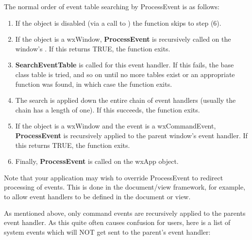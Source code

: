 The normal order of event table searching by ProcessEvent is as follows:

\begin{enumerate}\itemsep=0pt
\item If the object is disabled (via a call to )
the function skips to step (6).
\item If the object is a wxWindow, {\bf ProcessEvent} is recursively called on the window's\rtfsp
{}. If this returns TRUE, the function exits.
\item {\bf SearchEventTable} is called for this event handler. If this fails, the base
class table is tried, and so on until no more tables exist or an appropriate function was found,
in which case the function exits.
\item The search is applied down the entire chain of event handlers (usually the chain has a length
of one). If this succeeds, the function exits.
\item If the object is a wxWindow and the event is a wxCommandEvent, {\bf ProcessEvent} is
recursively applied to the parent window's event handler. If this returns TRUE, the function exits.
\item Finally, {\bf ProcessEvent} is called on the wxApp object.
\end{enumerate}

Note that your application may wish to override ProcessEvent to redirect processing of
events. This is done in the document/view framework, for example, to allow event handlers
to be defined in the document or view.

As mentioned above, only command events are recursively applied to the parents event
handler. As this quite often causes confusion for users, here is a list of system
events which will NOT get sent to the parent's event handler:


